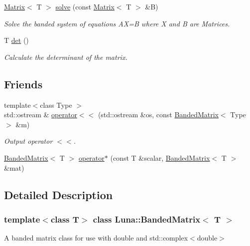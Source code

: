 \begin{DoxyCompactItemize}
\hyperlink{classLuna_1_1Matrix}{Matrix}$<$ T $>$ \hyperlink{classLuna_1_1BandedMatrix_a1f404c3a91848886905eb35ce5b88df6}{solve} (const \hyperlink{classLuna_1_1Matrix}{Matrix}$<$ T $>$ \&B)
\begin{DoxyCompactList}\small\item\em Solve the banded system of equations AX=B where X and B are Matrices. \end{DoxyCompactList}\item 
T \hyperlink{classLuna_1_1BandedMatrix_a6455e3c49e4b5cf11a2b604fa4a318fc}{det} ()
\begin{DoxyCompactList}\small\item\em Calculate the determinant of the matrix. \end{DoxyCompactList}\end{DoxyCompactItemize}
\subsection*{Friends}
\begin{DoxyCompactItemize}
\item 
{\footnotesize template$<$class Type $>$ }\\std\+::ostream \& \hyperlink{classLuna_1_1BandedMatrix_a5f7e5f998704a9afa0d803d600322ee0}{operator$<$$<$} (std\+::ostream \&os, const \hyperlink{classLuna_1_1BandedMatrix}{Banded\+Matrix}$<$ Type $>$ \&m)
\begin{DoxyCompactList}\small\item\em Output operator $<$$<$. \end{DoxyCompactList}\item 
\hyperlink{classLuna_1_1BandedMatrix}{Banded\+Matrix}$<$ T $>$ \hyperlink{classLuna_1_1BandedMatrix_a0211cb1d27d84fd2b89c476eefd96b1e}{operator$\ast$} (const T \&scalar, \hyperlink{classLuna_1_1BandedMatrix}{Banded\+Matrix}$<$ T $>$ \&mat)
\end{DoxyCompactItemize}


\subsection{Detailed Description}
\subsubsection*{template$<$class T$>$\newline
class Luna\+::\+Banded\+Matrix$<$ T $>$}

A banded matrix class for use with double and std\+::complex$<$double$>$ 

